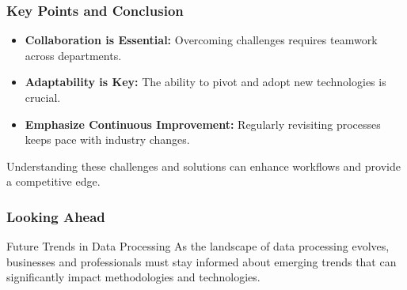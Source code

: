 \documentclass{beamer}
\begin{document}
\begin{frame}[fragile]
    \frametitle{Key Points and Conclusion}
    \begin{itemize}
        \item \textbf{Collaboration is Essential:} Overcoming challenges requires teamwork across departments.
        \item \textbf{Adaptability is Key:} The ability to pivot and adopt new technologies is crucial.
        \item \textbf{Emphasize Continuous Improvement:} Regularly revisiting processes keeps pace with industry changes.
    \end{itemize}
    Understanding these challenges and solutions can enhance workflows and provide a competitive edge.
\end{frame}

\begin{frame}[fragile]
    \frametitle{Looking Ahead}
    
    \begin{block}{Future Trends in Data Processing}
        As the landscape of data processing evolves, businesses and professionals must stay informed about emerging trends that can significantly impact methodologies and technologies.
    \end{block}
\end{frame}
\end{document}
